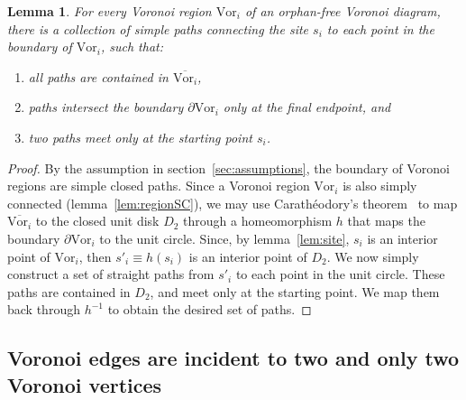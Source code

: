 \documentclass[11pt]{article}
\newtheorem{lemma}{Lemma}
\newcommand{\Vor}{\text{Vor}}
\begin{document}
\begin{lemma}\label{lem:regionpath}
For every Voronoi region $\Vor_i$ of an orphan-free Voronoi diagram, 
there is a collection of simple paths connecting the site $s_i$ to each point in the boundary of $\Vor_i$, 
	 such that:
\begin{enumerate}
	\item all paths are contained in $\overline{\Vor_i}$,
	\item paths intersect the boundary $\partial\Vor_i$ only at the final endpoint, and 
	\item two paths meet only at the starting point $s_i$.  
	\end{enumerate}
\end{lemma}
\begin{proof}
By the assumption in section~\ref{sec:assumptions}, the boundary of Voronoi regions are simple closed paths. 
Since a Voronoi region $\Vor_i$ is also simply connected (lemma~\ref{lem:regionSC}), we may use Carath\'eodory's theorem~\cite{conformal}
	to map $\overline{\Vor_i}$ to the closed unit disk $D_2$ through a homeomorphism $h$  
	that maps the boundary $\partial\Vor_i$ to the unit circle. 
Since, by lemma~\ref{lem:site}, $s_i$ is an interior point of $\Vor_i$, 
	then $s'_i\equiv h(s_i)$ is an interior point of $D_2$. 
We now simply construct a set of straight paths from $s'_i$ to each point in the unit circle. 
These paths are contained in $D_2$, and meet only at the starting point. 
We map them back through $h^{-1}$ to obtain the desired set of paths. 
\end{proof}



\subsection{Voronoi edges are incident to two and only two Voronoi vertices}
\end{document}
